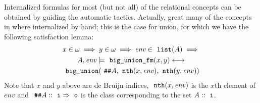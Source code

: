 Internalized formulas for most (but not all) of the relational
concepts can be obtained by guiding the automatic tactics. Actually,
great many of the concepts in  where
internalized by hand; this is the case for union,
for which we have the following satisfaction lemma:
\begin{multline}\label{eq:sats_big_union_fm}
  x \in \omega \implies y \in \omega \implies \mathit{env} \in \isatt{list}(A)
  \implies \\
  A, \mathit{env} \models \isatt{big{\uscore}union{\uscore}fm}(x,y)%
  \longleftrightarrow \\
  \isatt{big{\uscore}union}(\isatt{\#\#} A, \isatt{nth}(x,
  \mathit{env}), \isatt{nth}(y, \mathit{env}))
\end{multline}
Note that $x$ and $y$ above are de Bruijn indices,
$\isatt{nth}(x,\mathit{env})$ is the $x$th element of $\mathit{env}$
and $\isatt{\#\#}A::\tyi\fun \tyo$ is the class corresponding to the
set $A::\tyi$.

